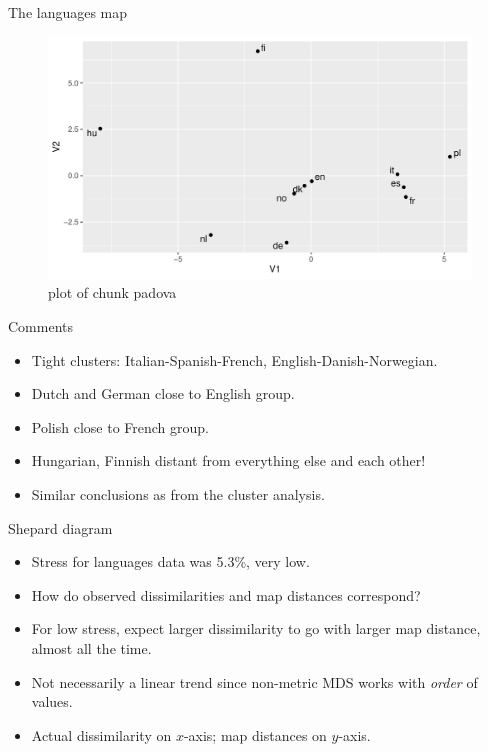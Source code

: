\documentclass[ignorenonframetext,]{beamer}
\begin{document}
\begin{frame}{The languages map}
\protect\hypertarget{the-languages-map}{}

\begin{figure}
\centering
\includegraphics{figure/padova-1.pdf}
\caption{plot of chunk padova}
\end{figure}

\end{frame}

\begin{frame}{Comments}
\protect\hypertarget{comments-30}{}

\begin{itemize}
\item
  Tight clusters: Italian-Spanish-French, English-Danish-Norwegian.
\item
  Dutch and German close to English group.
\item
  Polish close to French group.
\item
  Hungarian, Finnish distant from everything else and each other!
\item
  Similar conclusions as from the cluster analysis.
\end{itemize}

\end{frame}

\begin{frame}{Shepard diagram}
\protect\hypertarget{shepard-diagram}{}

\begin{itemize}
\item
  Stress for languages data was 5.3\%, very low.
\item
  How do observed dissimilarities and map distances correspond?
\item
  For low stress, expect larger dissimilarity to go with larger map
  distance, almost all the time.
\item
  Not necessarily a linear trend since non-metric MDS works with
  \emph{order} of values.
\item
  Actual dissimilarity on \(x\)-axis; map distances on \(y\)-axis.
\end{itemize}

\end{frame}
\end{document}
